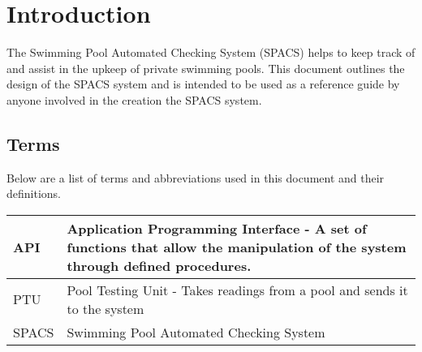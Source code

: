 \section{Introduction}

\par
The Swimming Pool Automated Checking System (SPACS) helps to keep track of and assist in the upkeep of private swimming pools. This document outlines the design of the SPACS system and is intended to be used as a reference guide by anyone involved in the creation the SPACS system.

\subsection{Terms}
\par
Below are a list of terms and abbreviations used in this document and their definitions.

\begin{center}
\begin{tabular}{| l | p{13cm} |}
\hline
API & Application Programming Interface - A set of functions that allow the manipulation of the system through defined procedures. \\ \hline
PTU & Pool Testing Unit - Takes readings from a pool and sends it to the system \\ \hline
SPACS & Swimming Pool Automated Checking System \\ \hline
\end{tabular}
\end{center}
